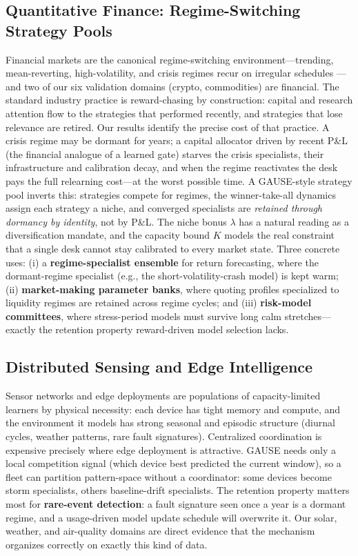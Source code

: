 \documentclass[10pt]{article}
\begin{document}
\subsection{Quantitative Finance: Regime-Switching Strategy Pools}

Financial markets are the canonical regime-switching environment---trending,
mean-reverting, high-volatility, and crisis regimes recur on irregular
schedules \cite{kirilenko2017flash}---and two of our six validation domains
(crypto, commodities) are financial. The standard industry practice is
reward-chasing by construction: capital and research attention flow to the
strategies that performed recently, and strategies that lose relevance are
retired. Our results identify the precise cost of that practice. A crisis
regime may be dormant for years; a capital allocator driven by recent P\&L
(the financial analogue of a learned gate) starves the crisis specialists,
their infrastructure and calibration decay, and when the regime reactivates
the desk pays the full relearning cost---at the worst possible time. A
GAUSE-style strategy pool inverts this: strategies compete for
regimes, the winner-take-all dynamics assign each strategy a niche, and
converged specialists are \emph{retained through dormancy by identity}, not
by P\&L. The niche bonus $\lambda$ has a natural reading as a diversification
mandate, and the capacity bound $K$ models the real constraint that a single
desk cannot stay calibrated to every market state. Three concrete uses:
(i) a \textbf{regime-specialist ensemble} for return forecasting, where the
dormant-regime specialist (e.g., the short-volatility-crash model) is kept
warm; (ii) \textbf{market-making parameter banks}, where quoting profiles
specialized to liquidity regimes are retained across regime cycles; and
(iii) \textbf{risk-model committees}, where stress-period models must survive
long calm stretches---exactly the retention property reward-driven model
selection lacks.

\subsection{Distributed Sensing and Edge Intelligence}

Sensor networks and edge deployments are populations of capacity-limited
learners by physical necessity: each device has tight memory and compute, and
the environment it models has strong seasonal and episodic structure (diurnal
cycles, weather patterns, rare fault signatures). Centralized coordination is
expensive precisely where edge deployment is attractive. GAUSE needs
only a local competition signal (which device best predicted the current
window), so a fleet can partition pattern-space without a coordinator: some
devices become storm specialists, others baseline-drift specialists. The
retention property matters most for \textbf{rare-event detection}: a fault
signature seen once a year is a dormant regime, and a usage-driven model
update schedule will overwrite it. Our solar, weather, and air-quality domains
are direct evidence that the mechanism organizes correctly on exactly this
kind of data.
\end{document}
